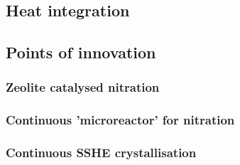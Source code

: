 \subsection{Heat integration}


\subsection{Points of innovation}

\subsubsection{Zeolite catalysed nitration}

\subsubsection{Continuous 'microreactor' for nitration}

\subsubsection{Continuous SSHE crystallisation}